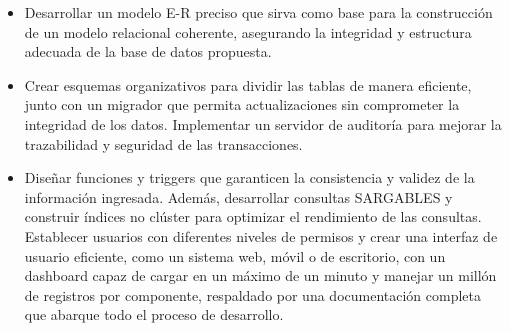 \begin{itemize}
    \item Desarrollar un modelo E-R preciso que sirva como base para la
        construcción de un modelo relacional coherente, asegurando la integridad y
        estructura adecuada de la base de datos propuesta.

    \item Crear esquemas organizativos para dividir las tablas de manera
        eficiente, junto con un migrador que permita actualizaciones sin
        comprometer la integridad de los datos. Implementar un servidor de
        auditoría para mejorar la trazabilidad y seguridad de las
        transacciones.

    \item Diseñar funciones y triggers que garanticen la consistencia y validez
        de la información ingresada. Además, desarrollar consultas SARGABLES y
        construir índices no clúster para optimizar el rendimiento de las
        consultas. Establecer usuarios con diferentes niveles de permisos y
        crear una interfaz de usuario eficiente, como un sistema web, móvil o
        de escritorio, con un dashboard capaz de cargar en un máximo de un
        minuto y manejar un millón de registros por componente, respaldado por
        una documentación completa que abarque todo el proceso de desarrollo.
\end{itemize}
